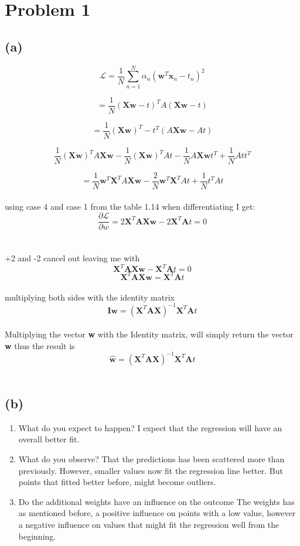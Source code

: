 \section{Problem 1}
\subsection{(a)}
$$ \mathcal{L} = \frac{1}{N} \sum\limits_{n=1}^{N} \alpha_{n} (\mathbf{w}^{T} \mathbf{x}_{n} - t_{n})^2 $$ 

$$  = \frac{1}{N} (\textbf{Xw}-t)^{T} A(\textbf{Xw}-t) $$

$$  = \frac{1}{N} (\textbf{Xw})^{T} - t^{T} (A\textbf{Xw}-At) $$

$$ \frac{1}{N} (\textbf{Xw})^{T} A\textbf{Xw} - \frac{1}{N} (\textbf{Xw})^{T} At  - \frac{1}{N} A\textbf{Xw}t^{T} + \frac{1}{N} Att^{T} $$

$$  = \frac{1}{N} \textbf{w}^{T} \textbf{X}^{T} A \textbf{Xw} - \frac{2}{N}\textbf{w}^{T}\textbf{X}^T A t + \frac{1}{N}t^{T} A t $$
\\
using case 4 and case 1 from the table 1.14 when differentiating I get:
\\
$$\frac{\partial\mathcal{L}}{\partial w} = 2 \textbf{X}^{T} \textbf{A} \textbf{Xw} - 2 \textbf{X}^{T} \textbf{A} t = 0$$
\\
\\
+2 and -2 cancel out leaving me with 
$$ \textbf{X}^{T} \textbf{A} \textbf{Xw} - \textbf{X}^{T} \textbf{A} t = 0 $$
$$ \textbf{X}^{T} \textbf{A} \textbf{Xw} = \textbf{X}^{T} \textbf{A} t $$
\\
multiplying both sides with the identity matrix
\\
$$ \textbf{I}\textbf{w} = (\textbf{X}^{T} \textbf{A} \textbf{X})^{-1} \textbf{X}^{T} \textbf{A} t $$
\\
Multiplying the vector \textbf{w} with the Identity matrix, will simply return the vector \textbf{w} thus the result is
$$ \hat{\textbf{w}} = (\textbf{X}^{T} \textbf{A} \textbf{X})^{-1} \textbf{X}^{T} \textbf{A} t $$
\\
\subsection{(b)}
\begin{enumerate}
    \item What do you expect to happen?
        I expect that the regression will have an overall better fit.
    \item What do you observe?
        That the predictions has been scattered more than previously. However, smaller values now fit
        the regression line better. But points that fitted better before, might become outliers.
    \item Do the additional weights have an influence on the outcome
        The weights has as mentioned before, a positive influence on points with a low value, however
        a negative influence on values that might fit the regression well from the beginning.

\end{enumerate}

